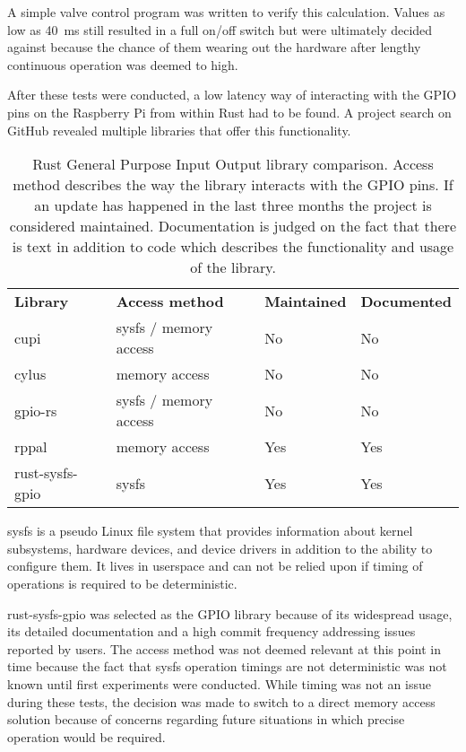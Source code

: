 A simple valve control program was written to verify this calculation. Values as low as \SI{40}{\milli\second} still resulted in a full on/off switch but were ultimately decided against because the chance of them wearing out the hardware after lengthy continuous operation was deemed to high.

After these tests were conducted, a low latency way of interacting with the GPIO pins on the Raspberry Pi from within Rust had to be found. A project search on GitHub revealed multiple libraries that offer this functionality. 

\begin{table}[h]
\centering
\begin{tabular}{llll}
\textbf{Library} & \textbf{Access method} & \textbf{Maintained} & \textbf{Documented} \\
cupi             & sysfs / memory access  & No                  & No                  \\
cylus            & memory access          & No                  & No                  \\
gpio-rs          & sysfs / memory access  & No                  & No                  \\
rppal            & memory access          & Yes                 & Yes                 \\
rust-sysfs-gpio  & sysfs                  & Yes                 & Yes
\end{tabular}
\caption{Rust General Purpose Input Output library comparison. Access method describes the way the library interacts with the GPIO pins. If an update has happened in the last three months the project is considered maintained. Documentation is judged on the fact that there is text in addition to code which describes the functionality and usage of the library.}
\end{table}

sysfs is a pseudo Linux file system that provides information about kernel subsystems, hardware devices, and device drivers in addition to the ability to configure them. It lives in userspace and can not be relied upon if timing of operations is required to be deterministic. 

rust-sysfs-gpio \cite{rust-sysfs-gpio} was selected as the GPIO library because of its widespread usage, its detailed documentation and a high commit frequency addressing issues reported by users. The access method was not deemed relevant at this point in time because the fact that sysfs operation timings are not deterministic was not known until first experiments were conducted. While timing was not an issue during these tests, the decision was made to switch to a direct memory access solution because of concerns regarding future situations in which precise operation would be required. 

